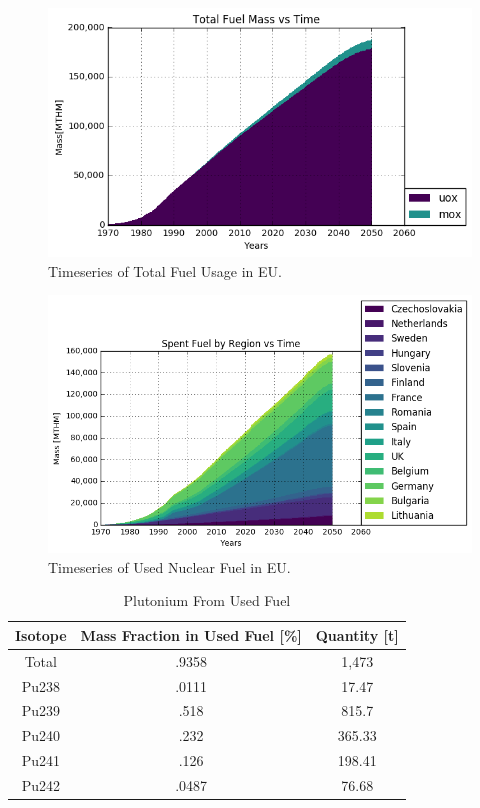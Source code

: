 \begin{figure}[htbp!]
	\begin{center}
		\includegraphics[scale=0.7]{./images/eu_future/total_fuel.png}
	\end{center}
	\caption{Timeseries of Total Fuel Usage in \gls{EU}.}
	\label{fig:eu_fuel}
\end{figure}


\begin{figure}[htbp!]
	\begin{center}
			\includegraphics[scale=0.7]{./images/eu_future/snf.png}
	\end{center}
	\caption{Timeseries of Used Nuclear Fuel in \gls{EU}.}
	\label{fig:eu_snf}
\end{figure}
\FloatBarrier


\begin{table}[h]
	\centering
	\begin{tabular}{|c|c|c|}
		\hline
		Isotope & Mass Fraction in Used Fuel [\%] & Quantity [t] \\ \hline
		Total & .9358 & 1,473 \\ \hline
		Pu238 & .0111 & 17.47 \\ \hline
		Pu239 & .518 & 815.7 \\ \hline
		Pu240 & .232 & 365.33 \\ \hline
		Pu241 & .126 & 198.41 \\ \hline
		Pu242 & .0487 & 76.68 \\ \hline
	\end{tabular}
	\caption{Plutonium From Used Fuel}
	\label{tab:pu}
\end{table}


